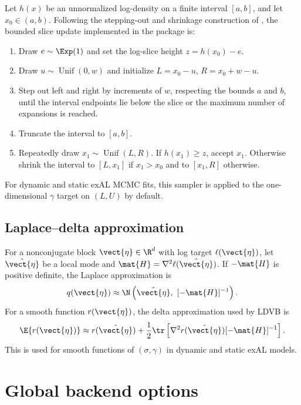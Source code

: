 Let $h(x)$ be an unnormalized log-density on a finite interval $[a,b]$, and let
$x_0\in(a,b)$. Following the stepping-out and shrinkage construction of
\citet{neal2003slice}, the bounded slice update implemented in the package is:
\begin{enumerate}[label=(\arabic*)]
\item Draw $e\sim\Exp(1)$ and set the log-slice height $z=h(x_0)-e$.
\item Draw $u\sim\operatorname{Unif}(0,w)$ and initialize
$L=x_0-u$, $R=x_0+w-u$.
\item Step out left and right by increments of $w$, respecting the bounds
$a$ and $b$, until the interval endpoints lie below the slice or the maximum
number of expansions is reached.
\item Truncate the interval to $[a,b]$.
\item Repeatedly draw $x_1\sim\operatorname{Unif}(L,R)$. If $h(x_1)\ge z$,
accept $x_1$. Otherwise shrink the interval to $[L,x_1]$ if $x_1>x_0$ and to
$[x_1,R]$ otherwise.
\end{enumerate}
For dynamic and static exAL MCMC fits, this sampler is applied to the
one-dimensional $\gamma$ target on $(L,U)$ by default.

\subsection{Laplace--delta approximation}

For a nonconjugate block $\vect{\eta}\in\R^d$ with log target
$\ell(\vect{\eta})$, let $\hat{\vect{\eta}}$ be a local mode and
$\mat{H}=\nabla^2\ell(\hat{\vect{\eta}})$. If $-\mat{H}$ is positive definite,
the Laplace approximation is
\begin{equation}
q(\vect{\eta})\approx
\N\left(\hat{\vect{\eta}},\ [-\mat{H}]^{-1}\right).
\label{eq:ld_gaussian}
\end{equation}
For a smooth function $r(\vect{\eta})$, the delta approximation used by LDVB is
\begin{equation}
\E\{r(\vect{\eta})\}
\approx
r(\hat{\vect{\eta}})
+
\frac{1}{2}\tr\left[
\nabla^2 r(\hat{\vect{\eta}})[-\mat{H}]^{-1}
\right].
\label{eq:delta_generic}
\end{equation}
This is used for smooth functions of $(\sigma,\gamma)$ in dynamic and static
exAL models.

\section{Global backend options}
\label{sec:supp_backend_options}

